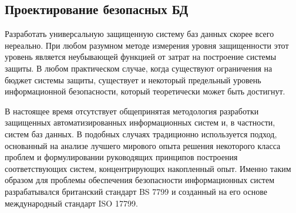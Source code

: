 \subsection{Проектирование безопасных БД}
Разработать универсальную защищенную систему баз данных скорее всего нереально. При любом
разумном методе измерения уровня защищенности этот уровень является неубывающей функцией
от затрат на построение системы защиты. В любом практическом случае, когда существуют
ограничения на бюджет системы защиты, существует и некоторый предельный уровень
информационной безопасности, который теоретически может быть достигнут.

В настоящее время отсутствует общепринятая методология разработки защищенных
автоматизированных информационных систем и, в частности, систем баз данных. В подобных
случаях традиционно используется подход, основанный на анализе лучшего мирового опыта
решения некоторого класса проблем и формулировании руководящих принципов построения
соответствующих систем, концентрирующих накопленный опыт. Именно таким образом для проблемы
обеспечения безопасности информационных систем разрабатывался британский стандарт BS 7799
и созданный на его основе международный стандарт ISO 17799.

